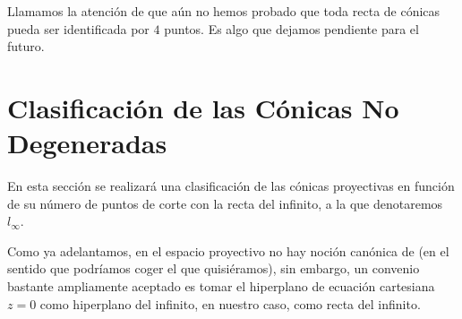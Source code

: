 Llamamos la atención de que aún no hemos probado que toda recta de cónicas pueda ser identificada por $4$ puntos. Es algo que dejamos pendiente para el futuro. 
\section{Clasificación de las Cónicas No Degeneradas}
En esta sección se realizará una clasificación de las cónicas proyectivas en función de su número de puntos de corte con la recta del infinito, a la que denotaremos $l_\infty$.

Como ya adelantamos, en el espacio proyectivo no hay noción canónica de  (en el sentido que podríamos coger el que quisiéramos), sin embargo, un convenio bastante ampliamente aceptado es tomar el hiperplano de ecuación cartesiana $z=0$ como hiperplano del infinito, en nuestro caso, como recta del infinito.

